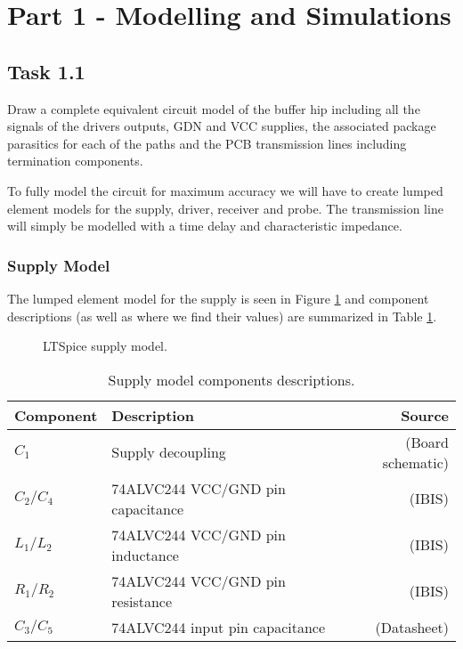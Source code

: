 \documentclass[../main.tex]{subfiles}
\begin{document}
\section{Part 1 - Modelling and Simulations}

\subsection{Task 1.1}

Draw a complete equivalent circuit model of the buffer hip including all the signals of the drivers outputs, GDN and VCC supplies, the associated package parasitics for each of the paths and the PCB transmission lines including termination components.

\solution

To fully model the circuit for maximum accuracy we will have to create lumped element models for the supply, driver, receiver and probe. The transmission line will simply be modelled with a time delay and characteristic impedance.

\subsubsection{Supply Model}

The lumped element model for the supply is seen in Figure \ref{fig:supply} and component descriptions (as well as where we find their values) are summarized in Table \ref{tab:supply}.

\begin{figure}[h]
    \centering
    \caption{LTSpice supply model.}
    \label{fig:supply}
\end{figure}

\begin{table}[h]
    \centering
    \begin{tabular}{l|l r}
        \toprule[1pt]
        \textbf{Component} & \textbf{Description} & \textbf{Source}\\
        \midrule
        $C_1$       & Supply decoupling & (Board schematic) \\
        $C_2/C_4$   & 74ALVC244 VCC/GND pin capacitance & (IBIS) \\
        $L_1/L_2$   & 74ALVC244 VCC/GND pin inductance & (IBIS) \\
        $R_1/R_2$   & 74ALVC244 VCC/GND pin resistance & (IBIS) \\
        $C_3/C_5$   & 74ALVC244 input pin capacitance & (Datasheet) \\
        \bottomrule[1pt]
    \end{tabular}
    \caption{Supply model components descriptions.}
    \label{tab:supply}
\end{table}
\end{document}
